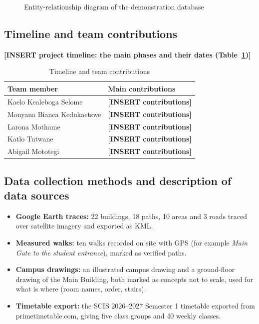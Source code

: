 \documentclass[12pt,a4paper]{report}
\newcommand{\tablespacing}{\singlespacing\small}
\newcommand{\placeholder}[1]{\textbf{[INSERT #1]}}
\begin{document}
\begin{figure}[htbp]
\centering
\resizebox{0.85\textwidth}{!}{}
\caption{Entity-relationship diagram of the demonstration database}\label{fig:er}
\end{figure}

\subsection{Timeline and team contributions}
\placeholder{project timeline: the main phases and their dates (Table~\ref{tab:timeline})}

\begin{table}[htbp]
\centering\tablespacing
\caption{Timeline and team contributions}\label{tab:timeline}
\begin{tabular}{p{4.5cm}p{9.5cm}}
\toprule
Team member & Main contributions \\
\midrule
Kaelo Kealeboga Selome & \placeholder{contributions} \\
Monyana Bianca Kedukaetswe & \placeholder{contributions} \\
Larona Mothame & \placeholder{contributions} \\
Katlo Tutwane & \placeholder{contributions} \\
Abigail Mototegi & \placeholder{contributions} \\
\bottomrule
\end{tabular}
\end{table}

\subsection{Data collection methods and description of data sources}
\begin{itemize}
  \item \textbf{Google Earth traces:} 22 buildings, 18 paths, 10 areas and 3 roads traced over satellite imagery and exported as KML.
  \item \textbf{Measured walks:} ten walks recorded on site with GPS (for example \emph{Main Gate to the student entrance}), marked as verified paths.
  \item \textbf{Campus drawings:} an illustrated campus drawing and a ground-floor drawing of the Main Building, both marked as concepts not to scale, used for what is where (room names, order, stairs).
  \item \textbf{Timetable export:} the SCIS 2026--2027 Semester 1 timetable exported from primetimetable.com, giving five class groups and 40 weekly classes.
\end{itemize}
\end{document}
